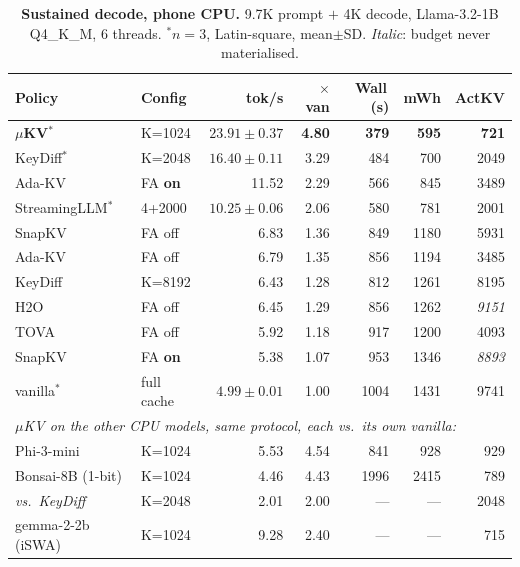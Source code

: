 \documentclass[sigconf,10pt]{acmart}
\begin{document}
\begin{table}[t]
\caption{\textbf{Sustained decode, phone CPU.} 9.7K prompt $+$ 4K decode, Llama-3.2-1B Q4\_K\_M, 6 threads. $^{*}$$n{=}3$, Latin-square, mean$\pm$SD. \emph{Italic}: budget never materialised.}
\label{tab:cpu}
\scriptsize
\setlength{\tabcolsep}{2.6pt}
\begin{tabular}{llrrrrr}
\toprule
\textbf{Policy} & \textbf{Config} & \textbf{tok/s} & \textbf{$\times$van} & \textbf{Wall\,(s)} & \textbf{mWh} & \textbf{ActKV} \\
\midrule
\textbf{$\mu$KV}$^{*}$ & K=1024 & $\mathbf{23.91{\pm}0.37}$ & \textbf{4.80} & \textbf{379} & \textbf{595} & \textbf{721} \\
KeyDiff$^{*}$      & K=2048 & $16.40{\pm}0.11$ & 3.29 & 484 & 700 & 2049 \\
Ada-KV             & FA \textbf{on} & 11.52 & 2.29 & 566 & 845 & 3489 \\
StreamingLLM$^{*}$ & 4+2000 & $10.25{\pm}0.06$ & 2.06 & 580 & 781 & 2001 \\
SnapKV             & FA off & 6.83 & 1.36 & 849 & 1180 & 5931 \\
Ada-KV             & FA off & 6.79 & 1.35 & 856 & 1194 & 3485 \\
KeyDiff            & K=8192 & 6.43 & 1.28 & 812 & 1261 & 8195 \\
H2O                & FA off & 6.45 & 1.29 & 856 & 1262 & \textit{9151} \\
TOVA               & FA off & 5.92 & 1.18 & 917 & 1200 & 4093 \\
SnapKV             & FA \textbf{on} & 5.38 & 1.07 & 953 & 1346 & \textit{8893} \\
vanilla$^{*}$      & full cache & $4.99{\pm}0.01$ & 1.00 & 1004 & 1431 & 9741 \\
\midrule
\multicolumn{7}{l}{\emph{$\mu$KV on the other CPU models, same protocol, each vs.\ its own vanilla:}}\\
Phi-3-mini   & K=1024 & 5.53 & 4.54 & 841 & 928 & 929 \\
Bonsai-8B (1-bit) & K=1024 & 4.46 & 4.43 & 1996 & 2415 & 789 \\
\quad\emph{vs.\ KeyDiff} & K=2048 & 2.01 & 2.00 & --- & --- & 2048 \\
gemma-2-2b (iSWA) & K=1024 & 9.28 & 2.40 & --- & --- & 715 \\
\bottomrule
\end{tabular}
\end{table}
\end{document}
